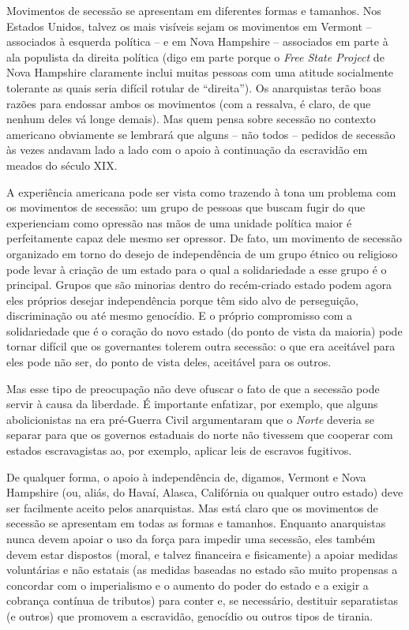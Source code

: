 Movimentos de secessão se apresentam em diferentes formas e tamanhos. Nos Estados Unidos, talvez os mais visíveis sejam os movimentos em Vermont -- associados à esquerda política -- e em Nova Hampshire -- associados em parte à ala populista da direita política (digo em parte porque o \emph{Free State Project} de Nova Hampshire claramente inclui muitas pessoas com uma atitude socialmente tolerante as quais seria difícil rotular de ``direita''). Os anarquistas terão boas razões para endossar ambos os movimentos (com a ressalva, é claro, de que nenhum deles vá longe demais). Mas quem pensa sobre secessão no contexto americano obviamente se lembrará que alguns -- não todos -- pedidos de secessão às vezes andavam lado a lado com o apoio à continuação da escravidão em meados do século XIX.

A experiência americana pode ser vista como trazendo à tona um problema com os movimentos de secessão: um grupo de pessoas que buscam fugir do que experienciam como opressão nas mãos de uma unidade política maior é perfeitamente capaz dele mesmo ser opressor. De fato, um movimento de secessão organizado em torno do desejo de independência de um grupo étnico ou religioso pode levar à criação de um estado para o qual a solidariedade a esse grupo é o principal. Grupos que são minorias dentro do recém-criado estado podem agora eles próprios desejar independência porque têm sido alvo de perseguição, discriminação ou até mesmo genocídio. E o próprio compromisso com a solidariedade que é o coração do novo estado (do ponto de vista da maioria) pode tornar difícil que os governantes tolerem outra secessão: o que era aceitável para eles pode não ser, do ponto de vista deles, aceitável para os outros.

Mas esse tipo de preocupação não deve ofuscar o fato de que a secessão pode servir à causa da liberdade. É importante enfatizar, por exemplo, que alguns abolicionistas na era pré-Guerra Civil argumentaram que o \emph{Norte} deveria se separar para que os governos estaduais do norte não tivessem que cooperar com estados escravagistas ao, por exemplo, aplicar leis de escravos fugitivos.

De qualquer forma, o apoio à independência de, digamos, Vermont e Nova Hampshire (ou, aliás, do Havaí, Alasca, Califórnia ou qualquer outro estado) deve ser facilmente aceito pelos anarquistas. Mas está claro que os movimentos de secessão se apresentam em todas as formas e tamanhos. Enquanto anarquistas nunca devem apoiar o uso da força para impedir uma secessão, eles também devem estar dispostos (moral, e talvez financeira e fisicamente) a apoiar medidas voluntárias e não estatais (as medidas baseadas no estado são muito propensas a concordar com o imperialismo e o aumento do poder do estado e a exigir a cobrança contínua de tributos) para conter e, se necessário, destituir separatistas (e outros) que promovem a escravidão, genocídio ou outros tipos de tirania.

